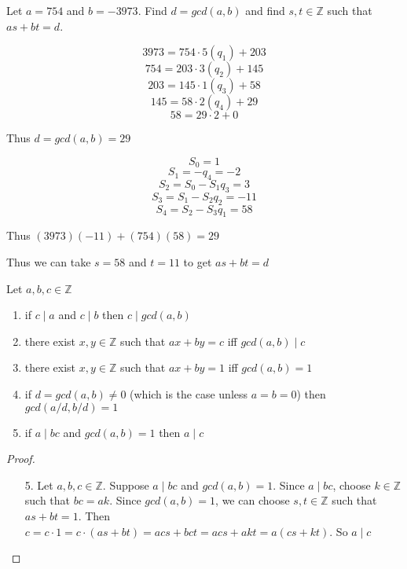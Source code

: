 \begin{exmp}
Let $a=754$ and $b=-3973$. Find $d = gcd(a,b)$ and find $s,t\in\mathbb{Z}$ such that $as+bt = d$.
\end{exmp}
\begin{solution}
\[3973 = 754 \cdot 5(q_1) + 203\]
\[754 = 203 \cdot 3(q_2) + 145\]
\[203 = 145 \cdot 1(q_3) + 58\]
\[145 = 58 \cdot 2(q_4) + 29\]
\[58 = 29 \cdot 2 + 0\]

Thus $d = gcd(a,b) = 29$

\[S_0 = 1\]
\[S_1 = -q_4 = -2\]
\[S_2 = S_0 - S_1q_3 = 3\]
\[S_3 = S_1 - S_2q_2 = -11\]
\[S_4 = S_2 - S_3q_1 = 58\]

Thus $(3973)(-11) + (754)(58) = 29$

Thus we can take $s = 58$ and $t = 11$ to get $as + bt = d$
\end{solution}


\begin{thm}
Let $a,b,c\in\mathbb{Z}$
\begin{enumerate}
\item if $c\mid a $ and $c\mid b$ then $c\mid gcd(a,b)$
\item there exist $x,y\in\mathbb{Z}$ such that $ax+by = c$ iff $gcd(a,b)\mid c$
\item there exist $x,y\in\mathbb{Z}$ such that $ax+by = 1$ iff $gcd(a,b) = 1$
\item if $d = gcd(a,b) \neq 0$ (which is the case unless $a=b=0$) then $gcd(a/d,b/d) = 1$
\item if $a\mid bc$ and $gcd(a,b) = 1$ then $a\mid c$
\end{enumerate}
\end{thm}

\begin{proof}
\begin{enumerate}
\item[5.] Let $a,b,c\in\mathbb{Z}$. Suppose $a\mid bc$ and $gcd(a,b) = 1$. Since $a\mid bc$, choose $k\in\mathbb{Z}$ such that $bc = ak$. Since $gcd(a,b) = 1$, we can choose $s,t\in\mathbb{Z}$ such that $as+bt = 1$. Then $c=c\cdot 1 = c\cdot (as+bt) = acs + bct = acs + akt = a(cs + kt)$. So $a\mid c$
\end{enumerate}
\end{proof}